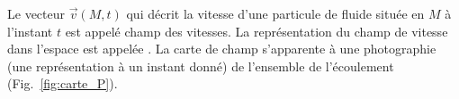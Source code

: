 \documentclass[12pt,fancy]{cours}
\begin{document}
  


Le vecteur $\Vec{v}(M,t)$ qui décrit la vitesse d'une particule de fluide située en $M$ à l'instant $t$ est appelé champ des vitesses. La représentation du champ de vitesse dans l'espace est appelée . La carte de champ s'apparente à une photographie (une représentation à un instant donné) de l'ensemble de l'écoulement (Fig.~\ref{fig:carte_P}). 
\end{document}
